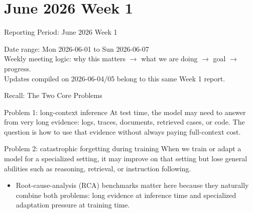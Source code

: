 
\section{June 2026 Week 1}

\begin{frame}{Reporting Period: June 2026 Week 1}
  \begin{center}
    \small Date range: Mon 2026-06-01 to Sun 2026-06-07 \\
    \scriptsize Weekly meeting logic: why this matters $\rightarrow$ what we are doing $\rightarrow$ goal $\rightarrow$ progress. \\
    \scriptsize Updates compiled on 2026-06-04/05 belong to this same Week 1 report.
  \end{center}
\end{frame}

\begin{frame}{Recall: The Two Core Problems}
  \small
  \begin{block}{Problem 1: long-context inference}
    At test time, the model may need to answer from very long evidence: logs,
    traces, documents, retrieved cases, or code. The question is how to use that
    evidence without always paying full-context cost.
  \end{block}
  \begin{block}{Problem 2: catastrophic forgetting during training}
    When we train or adapt a model for a specialized setting, it may improve on
    that setting but lose general abilities such as reasoning, retrieval, or
    instruction following.
  \end{block}
  \begin{itemize}
    \item Root-cause-analysis (RCA) benchmarks matter here because they naturally
      combine both problems: long evidence at inference time and specialized
      adaptation pressure at training time.
  \end{itemize}
\end{frame}

